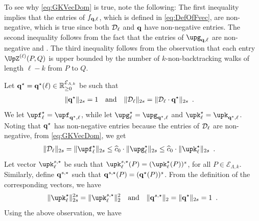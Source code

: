 \documentclass[11pt,reqno]{amsart}
\numberwithin{equation}{section}
\newcommand{\cE}{{\mathcal{E}}}
\newcommand{\applegreen}[1]{ {\color{applegreen}#1}}
\newcommand{\amethyst}[1]{{\color{amethyst}#1} }
\newcommand{\bluepigment}[1]{{\color{blue(pigment)}#1}}
\newcommand{\darkmagenta}[1]{{\color{darkmagenta}#1}}
\newcommand{\goldenbrown}[1]{{\color{goldenbrown}#1}}
\newcommand{\iris}[1]{{\color{iris}#1}}
\newcommand{\ExtV}{\iris{\cE}}
\newcommand{\pfs}{\darkmagenta{s}}
\newcommand{\norm}[2]{\goldenbrown{\|} #1 \goldenbrown{\|}_{#2}}
\newcommand{\nnorm}[3]{\goldenbrown{\|} #1\goldenbrown{\|}^{#2}_{#3}}
\renewcommand{\applegreen}[1]{#1}
\renewcommand{\amethyst}[1]{#1}
\renewcommand{\bluepigment}[1]{#1}
\renewcommand{\darkmagenta}[1]{#1}
\renewcommand{\goldenbrown}[1]{#1}
\renewcommand{\iris}[1]{#1}
\newcommand{\kk}{\bluepigment{k}}
\newcommand{\kell}{{\color{green(pigment)}\ell}}%
\newcommand{\kP}{\goldenbrown{P}}
\newcommand{\kQ}{\amethyst{Q}}
\renewcommand{\kk}{k}
\renewcommand{\kell}{\ell}
\renewcommand{\kP}{P}
\renewcommand{\kQ}{Q}
\begin{document}
To see why \eqref{eq:GKVecDom} is true, note the following: The first inequality implies that the entries of 
$f_{\vtest,\kell}$, which is defined in \eqref{eq:DefOfFvec}, are non-negative, which is true since both
$\ExtdInfMatrixL_{\kell}$ and $\vtest$ have non-negative entries. 
The second inequality follows from the fact that the entries of $\vecG_{\vtest,\kell}$ are non-negative and
 . 
The third inequality follows from the observation that each entry $\TAdj^{(\kell)}(\kP, \kQ)$ is upper bounded by the 
number of $\kk$-non-backtracking walks of length $\kell-\kk$ from $\kP$ to $\kQ$. 


Let $\vtest^{\star}=\vtest^{\star}(\kell) \in \mathbb{R}^{\ExtV_{\Lambda,\kk}}_{\geq 0}$ be 
 such that 
\begin{align}\label{eq:Norm2sYLVsKStar}
\norm{ \vtest^{\star}}{2\pfs}&=1& \textrm{and} &&
\norm{\ExtdInfMatrixL_{\kell}}{2\pfs}&=\norm{ \ExtdInfMatrixL_{\kell}\cdot \vtest^{\star}}{2\pfs} \enspace.
\end{align}
We let $\vecF^{\star}_{\kell}=\vecF_{\vtest^{\star}, \kell}$, while let $\vecG^{\star}_{\kell}=\vecG_{\vtest^{\star}, \kell}$ and 
 $\vecK^{\star}_{\kell}=\vecK_{\vtest^{\star}, \kell}$. 
%
Noting that $\vtest^{\star}$ has non-negative entries because the entries of $\ExtdInfMatrixL_{\kell}$ are non-negative, 
%
from \eqref{eq:GKVecDom}, we get
\begin{align}\label{eq:KSNorm4L1}
\norm{ \ExtdInfMatrixL_{\kell}}{2\pfs}&=\norm{ \vecF^{\star}_{\kell}}{2\pfs} \leq 
\widehat{c}_0 \cdot \norm{ \vecG^{\star}_{\kell}}{2\pfs} \leq \widehat{c}_0 \cdot \norm{ \vecK^{\star}_{\kell}}{2\pfs} \enspace. 
\end{align}
Let vector $\vecK^{\pfs,\star}_{\kell}$ be such that $\vecK^{\pfs,\star}_{\kell}(\kP)=({\vecK}^{\star}_{\kell}(\kP))^{\pfs}$, 
for all $\kP\in \ExtV_{\Lambda,\kk}$. Similarly, define $\vtest^{\pfs,\star}$ such that $\vtest^{\pfs,\star}(\kP)=({\vtest}^{\star}(\kP))^{\pfs}$. 
%
From the definition of the corresponding vectors, we have  
\begin{align}\label{eq:KstarL2sVsBarKStarL2}
\nnorm{ \vecK^{\star}_{\kell}}{2\pfs}{2\pfs}&=\nnorm{ \vecK^{\pfs,\star}_{\kell}}{2}{2}&
\textrm{and} && 
\norm{ \vtest^{\pfs,\star}}{2}=\norm{ \vtest^{\star}}{2\pfs}=1
\enspace. 
\end{align}
% 
Using the above observation,  we have
\end{document}
